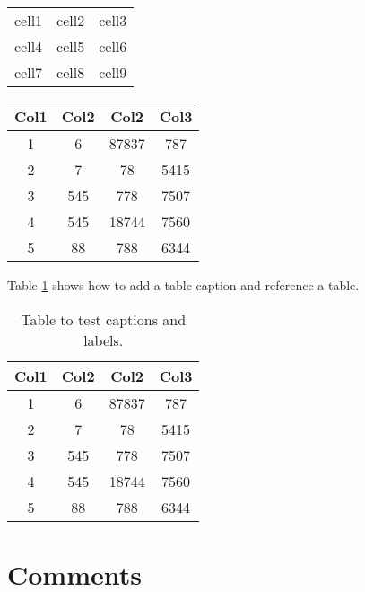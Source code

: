 \documentclass{article}
\begin{document}
\begin{center}
\begin{tabular}{|c|c|c|} 
  \hline
  cell1 & cell2 & cell3 \\ 
  cell4 & cell5 & cell6 \\ 
  cell7 & cell8 & cell9 \\ 
  \hline
\end{tabular}
\end{center}


\begin{center}
\begin{tabular}{||c c c c||} 
  \hline
  Col1 & Col2 & Col2 & Col3 \\ [0.5ex] 
  \hline\hline
  1 & 6 & 87837 & 787 \\ 
  \hline
  2 & 7 & 78 & 5415 \\
  \hline
  3 & 545 & 778 & 7507 \\
  \hline
  4 & 545 & 18744 & 7560 \\
  \hline
  5 & 88 & 788 & 6344 \\ [1ex] 
  \hline
\end{tabular}
\end{center}


Table \ref{table:data} shows how to add a table caption and reference a table.
\begin{table}[h!]
\centering
\begin{tabular}{||c c c c||} 
  \hline
  Col1 & Col2 & Col2 & Col3 \\ [0.5ex] 
  \hline\hline
  1 & 6 & 87837 & 787 \\ 
  2 & 7 & 78 & 5415 \\
  3 & 545 & 778 & 7507 \\
  4 & 545 & 18744 & 7560 \\
  5 & 88 & 788 & 6344 \\ [1ex] 
  \hline
\end{tabular}
\caption{Table to test captions and labels.}
\label{table:data}
\end{table}


\section{Comments}

\end{document}
